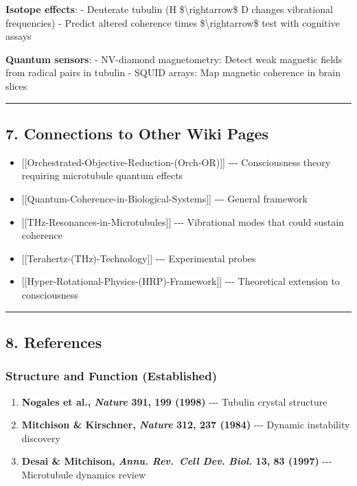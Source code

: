 \textbf{Isotope effects}: - Deuterate tubulin (H
\$\textbackslash rightarrow\$ D changes vibrational frequencies) -
Predict altered coherence times \$\textbackslash rightarrow\$ test with
cognitive assays

\textbf{Quantum sensors}: - NV-diamond magnetometry: Detect weak
magnetic fields from radical pairs in tubulin - SQUID arrays: Map
magnetic coherence in brain slices

\begin{center}\rule{0.5\linewidth}{0.5pt}\end{center}

\subsection{7. Connections to Other Wiki
Pages}\label{connections-to-other-wiki-pages}

\begin{itemize}
\tightlist
\item
  {[}{[}Orchestrated-Objective-Reduction-(Orch-OR){]}{]} -\/-\/-
  Consciousness theory requiring microtubule quantum effects
\item
  {[}{[}Quantum-Coherence-in-Biological-Systems{]}{]} -\/-\/- General
  framework
\item
  {[}{[}THz-Resonances-in-Microtubules{]}{]} -\/-\/- Vibrational modes
  that could sustain coherence
\item
  {[}{[}Terahertz-(THz)-Technology{]}{]} -\/-\/- Experimental probes
\item
  {[}{[}Hyper-Rotational-Physics-(HRP)-Framework{]}{]} -\/-\/-
  Theoretical extension to consciousness
\end{itemize}

\begin{center}\rule{0.5\linewidth}{0.5pt}\end{center}

\subsection{8. References}\label{references}

\subsubsection{Structure and Function
(Established)}\label{structure-and-function-established}

\begin{enumerate}
\def\labelenumi{\arabic{enumi}.}
\tightlist
\item
  \textbf{Nogales et al., \emph{Nature} 391, 199 (1998)} -\/-\/- Tubulin
  crystal structure
\item
  \textbf{Mitchison \& Kirschner, \emph{Nature} 312, 237 (1984)} -\/-\/-
  Dynamic instability discovery
\item
  \textbf{Desai \& Mitchison, \emph{Annu. Rev.~Cell Dev. Biol.} 13, 83
  (1997)} -\/-\/- Microtubule dynamics review
\end{enumerate}


